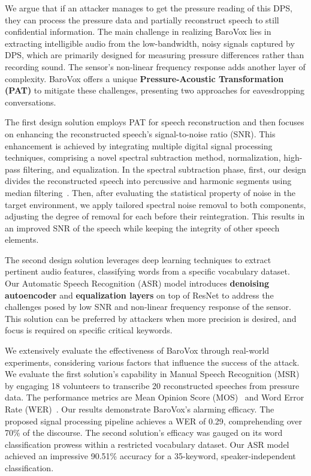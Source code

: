 \color{black}
We argue that if an attacker manages to get the pressure reading of this DPS, they can process the pressure data and partially reconstruct speech to still confidential information. 
The main challenge in realizing BaroVox lies in extracting intelligible audio from the low-bandwidth, noisy signals captured by DPS, which are primarily designed for measuring pressure differences rather than recording sound.
The sensor's non-linear frequency response adds another layer of complexity. 
BaroVox offers a unique \textbf{Pressure-Acoustic Transformation (PAT)} to mitigate these challenges, presenting two approaches for eavesdropping conversations.

The first design solution employs PAT for speech reconstruction and then focuses on enhancing the reconstructed speech's signal-to-noise ratio (SNR).
This enhancement is achieved by integrating multiple digital signal processing techniques, comprising a novel spectral subtraction method, normalization, high-pass filtering, and equalization.
In the spectral subtraction phase, first,
our design divides the reconstructed speech into percussive and harmonic segments using median filtering~\cite{fitzgerald2010harmonic, driedger2014extending}.
Then, after evaluating the statistical property of noise in the target environment, we apply tailored spectral noise removal to both components, adjusting the degree of removal for each before their reintegration. 
{This results in an improved SNR of the speech while keeping the integrity of other speech elements.}

The second design solution leverages deep learning techniques to extract pertinent audio features, classifying words from a specific vocabulary dataset. Our Automatic Speech Recognition (ASR) model introduces \textbf{denoising autoencoder} and \textbf{equalization
layers} on top of ResNet to address the challenges posed by low SNR and non-linear frequency response of the sensor. This solution can be preferred by attackers when more precision is desired, and focus is required on specific critical keywords. 

We extensively evaluate the effectiveness of BaroVox through real-world experiments, considering various factors that influence the success of the attack.
We evaluate the first solution's capability in Manual Speech Recognition (MSR) by engaging {18 volunteers to transcribe 20} reconstructed speeches from pressure data. 
The performance metrics are Mean Opinion Score (MOS)~\cite{leng2021mbnet} and Word Error Rate (WER)~\cite{errattahi2018automatic}. 
Our results demonstrate BaroVox's alarming efficacy. The proposed signal processing pipeline achieves a WER of 0.29, comprehending over 70\% of the discourse.
The second solution's efficacy was gauged on its word classification prowess within a restricted vocabulary dataset. 
Our ASR model achieved an impressive {{90.51}}\% accuracy for a 35-keyword, speaker-independent classification.

